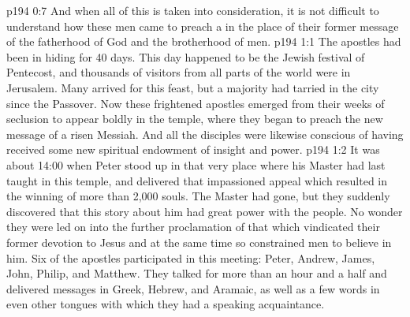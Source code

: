 \vs p194 0:7 And when all of this is taken into consideration, it is not difficult to understand how these men came to preach a  in the place of their former message of the fatherhood of God and the brotherhood of men.
\vs p194 1:1 The apostles had been in hiding for 40 days. This day happened to be the Jewish festival of Pentecost, and thousands of visitors from all parts of the world were in Jerusalem. Many arrived for this feast, but a majority had tarried in the city since the Passover. Now these frightened apostles emerged from their weeks of seclusion to appear boldly in the temple, where they began to preach the new message of a risen Messiah. And all the disciples were likewise conscious of having received some new spiritual endowment of insight and power.
\vs p194 1:2 It was about 14:00 when Peter stood up in that very place where his Master had last taught in this temple, and delivered that impassioned appeal which resulted in the winning of more than 2,000 souls. The Master had gone, but they suddenly discovered that this story about him had great power with the people. No wonder they were led on into the further proclamation of that which vindicated their former devotion to Jesus and at the same time so constrained men to believe in him. Six of the apostles participated in this meeting: Peter, Andrew, James, John, Philip, and Matthew. They talked for more than an hour and a half and delivered messages in Greek, Hebrew, and Aramaic, as well as a few words in even other tongues with which they had a speaking acquaintance.
